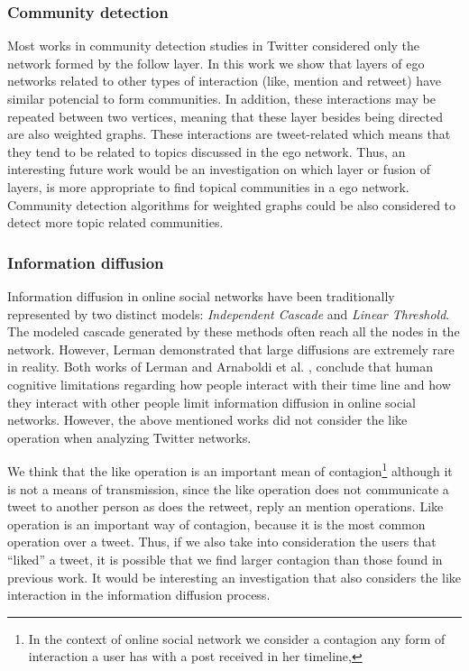 \subsubsection*{Community detection}
Most works in community detection studies in Twitter considered only the network formed by the follow layer. In this work we show that layers of ego networks related to other types of interaction (like, mention and retweet) have similar potencial to form communities. In addition, these interactions may be repeated between two vertices, meaning that these layer besides being directed are also weighted graphs. These interactions are tweet-related which means that they tend to be related to topics discussed in the ego network. Thus, an  interesting future work would  be an investigation on which layer or fusion of layers, is more appropriate to find topical communities in a ego network.  Community detection algorithms for weighted graphs could be also considered to detect more topic related communities. 

\subsubsection*{Information diffusion}

Information diffusion in online social networks have been traditionally represented by two distinct models: {\em Independent Cascade} %
and {\em Linear Threshold}. The modeled cascade generated by these methods often reach all the nodes in the network. However, Lerman \cite{Lerman2016} demonstrated  that  large diffusions are extremely rare in reality. Both works of Lerman \cite{Lerman2016} and Arnaboldi et al. \cite{ARNABOLDI2017}, conclude that human cognitive limitations regarding how people interact with their time line and  how they interact with other people limit information diffusion in online social networks. However, the above mentioned  works  did  not consider the like operation when analyzing Twitter networks.

We think that the like operation is an important mean of contagion\footnote{In the context of online social network we consider a contagion any form of interaction a user has with a post received in her timeline,} although it is not a  means of transmission, since the like operation does not communicate a tweet to another person as does the retweet, reply an mention operations. Like operation is an important way of contagion, because it is the most common operation  over a tweet. Thus, if we also take into consideration the users that ``liked'' a tweet, it is possible that we find larger contagion than those found in previous work. It would be interesting an investigation that also considers the like interaction in the information diffusion process.
 
